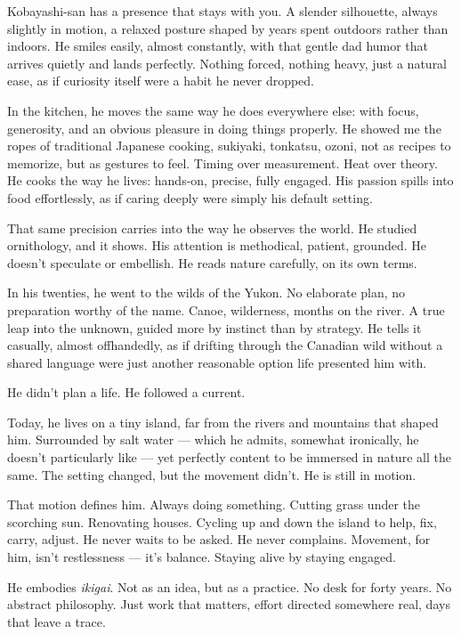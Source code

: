 \documentclass[
  letterpaper,
  oneside]{scrbook}
\begin{document}
Kobayashi-san has a presence that stays with you. A slender silhouette,
always slightly in motion, a relaxed posture shaped by years spent
outdoors rather than indoors. He smiles easily, almost constantly, with
that gentle dad humor that arrives quietly and lands perfectly. Nothing
forced, nothing heavy, just a natural ease, as if curiosity itself were
a habit he never dropped.

In the kitchen, he moves the same way he does everywhere else: with
focus, generosity, and an obvious pleasure in doing things properly. He
showed me the ropes of traditional Japanese cooking, sukiyaki, tonkatsu,
ozoni, not as recipes to memorize, but as gestures to feel. Timing over
measurement. Heat over theory. He cooks the way he lives: hands-on,
precise, fully engaged. His passion spills into food effortlessly, as if
caring deeply were simply his default setting.

That same precision carries into the way he observes the world. He
studied ornithology, and it shows. His attention is methodical, patient,
grounded. He doesn't speculate or embellish. He reads nature carefully,
on its own terms.

In his twenties, he went to the wilds of the Yukon. No elaborate plan,
no preparation worthy of the name. Canoe, wilderness, months on the
river. A true leap into the unknown, guided more by instinct than by
strategy. He tells it casually, almost offhandedly, as if drifting
through the Canadian wild without a shared language were just another
reasonable option life presented him with.

He didn't plan a life. He followed a current.

Today, he lives on a tiny island, far from the rivers and mountains that
shaped him. Surrounded by salt water --- which he admits, somewhat
ironically, he doesn't particularly like --- yet perfectly content to be
immersed in nature all the same. The setting changed, but the movement
didn't. He is still in motion.

That motion defines him. Always doing something. Cutting grass under the
scorching sun. Renovating houses. Cycling up and down the island to
help, fix, carry, adjust. He never waits to be asked. He never
complains. Movement, for him, isn't restlessness --- it's balance.
Staying alive by staying engaged.

He embodies \emph{ikigai}. Not as an idea, but as a practice. No desk
for forty years. No abstract philosophy. Just work that matters, effort
directed somewhere real, days that leave a trace.
\end{document}
